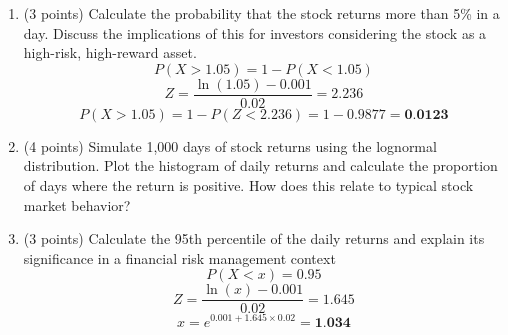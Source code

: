 \documentclass[a3paper,12pt]{article} %
\begin{document}
\begin{enumerate}
\begin{enumerate}
        \item (3 points) Calculate the probability that the stock returns more than 5\% in a day. Discuss the
        implications of this for investors considering the stock as a high-risk, high-reward asset.
        \[
            P(X > 1.05) = 1 - P(X < 1.05)
        \]
        \[
            Z = \frac{\ln(1.05) - 0.001}{0.02} = 2.236
        \]
        \[
            P(X > 1.05) = 1 - P(Z < 2.236) = 1 - 0.9877 = \textbf{0.0123}
        \]
        \item (4 points) Simulate 1,000 days of stock returns using the lognormal distribution. Plot the histogram
        of daily returns and calculate the proportion of days where the return is positive. How
        does this relate to typical stock market behavior?
        \item (3 points) Calculate the 95th percentile of the daily returns and explain its significance in a
        financial risk management context
        \[
            P(X < x) = 0.95
        \]
        \[
            Z = \frac{\ln(x) - 0.001}{0.02} = 1.645
        \]
        \[
            x = e^{0.001 + 1.645 \times 0.02} = \textbf{1.034}
        \]
        
    \end{enumerate}
\end{enumerate}
\end{document}
